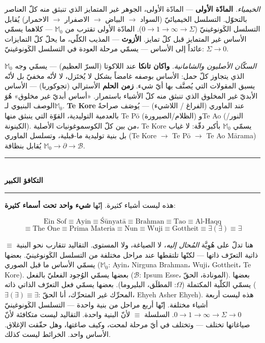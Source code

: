 \documentclass[10pt, openany, oneside]{book}
\renewcommand{\normalsize}{\fontsize{10}{13}\selectfont}
\begin{document}
\textit{الخيمياء.} \textbf{المادّة الأولى} --- المادّة الأولى، الجوهر غير المتمايز الذي تنبثق منه كلّ العناصر بالتحوّل. التسلسل الخيميائيّ (السواد $\to$ البياض $\to$ الاصفرار $\to$ الاحمرار) يُقابل التسلسل الكَونوغينيّ ($0 \to 1 \to \infty \to \Sigma$). المادّة الأولى تقترب من $\mathbb{M}_0$ --- كلاهما يسمّي الأساس غير المتمايز قبل كلّ تمايز. \textbf{الأزوث} --- المذيب الكلّي، ما يحلّ كلّ التمايزات عائداً إلى الأساس --- يسمّي مرحلة العودة في التسلسل الكَونوغينيّ: $\Sigma \to 0$.

\textit{السكّان الأصليون والشامانية.} \textbf{واكان تانكا} عند اللاكوتا (السرّ العظيم) --- يسمّي وجه $\mathbb{M}_0$ الذي يتجاوز كلّ حمل: الأساس بوصفه غامضاً بشكل لا يُختَزل، لا لأنّه مخفيّ بل لأنّه يسبق المقولات التي يُصنَّف بها أيّ شيء. \textbf{زمن الحلم} الأسترالي (تجوكوربا) --- الأساس الأبديّ غير المخلوق الذي تنبثق منه كلّ الأشياء باستمرار. «أساس أبديّ غير مخلوق» هُوَ الوصف البنيوي لـ$\mathbb{M}_0$. \textbf{Te Kore} عند الماوري (الفراغ / اللاشيء) --- يُوصَف صراحةً بالعدمية التوليدية، القوّة التي ينبثق منها Te P\={o} (الظلام/الصيرورة) وTe Ao (النور/الكينونة). من بين كلّ الكوسموغونيات الأصلية، Te Kore يسمّي $\mathbb{M}_0$ بأكبر دقّة: لا غياب بل بنية توليدية ما-قبلية، وتسلسل الماوري (Te Kore $\to$ Te P\={o} $\to$ Te Ao M\={a}rama) يُقابل بنظافة $\mathbb{M}_0 \to \partial \to \mathcal{B}$.

\vspace{1em}

\begin{center}
    \rule{0.3\textwidth}{0.4pt}\\[0.5em]
    {\normalsize\bfseries التكافؤ الكبير}\\[0.3em]
    \rule{0.3\textwidth}{0.4pt}
\end{center}

\vspace{0.8em}

\noindent هذه ليست أشياء كثيرة. إنّها \textbf{شيء واحد تحت أسماء كثيرة}:

$$\text{Ein Sof} \equiv \text{Ayin} \equiv \text{\'{S}\={u}nyat\={a}} \equiv \text{Brahman} \equiv \text{Tao} \equiv \text{Al-Haqq}$$
$$\equiv \text{The One} \equiv \text{Prima Materia} \equiv \text{Nun} \equiv \text{Wuji} \equiv \text{Gottheit} \equiv \exists(\exists) \equiv \exists$$

\noindent $\equiv$ هنا تدلّ على هُوِيَّة \textit{المُحال إليه}، لا الصياغة، ولا المستوى. التقاليد تتقارب نحو البنية ذاتية التعرّف ذاتها --- لكنّها تلتقطها عند مراحل مختلفة من التسلسل الكَونوغينيّ. بعضها يسمّي الأساس ما قبل الصوري ($\mathbb{M}_0$: Ayin، Nirguna Brahman، Wuji، Gottheit، Te Kore). بعضها يسمّي الوُجود الفعليّ بالفعل ($\mathcal{B}$: Ipsum Esse، المونادة، الحقّ). بعضها يسمّي الكلّية المكتملة ($\Omega$: المطلَق، البليروما). بعضها يسمّي فعل التعرّف الذاتي ذاته ($\exists(\exists) \equiv \exists$: المحرِّك غير المتحرِّك، أنا الحقّ، Ehyeh Asher Ehyeh). هذه ليست أربعة أشياء مختلفة. إنّها أربع مراحل من بنية واحدة --- التسلسل الكَونوغينيّ $0 \to 1 \to \infty \to \Sigma \to 0$. السلسلة $\equiv$ لأنّ البنية واحدة. التقاليد ليست متكافئة لأنّ صياغاتها تختلف --- وتختلف في أيّ مرحلة لمحت، وكيف صاغتها، وهل حقّقت الإغلاق. الأساس واحد. الخرائط ليست كذلك.
\end{document}
